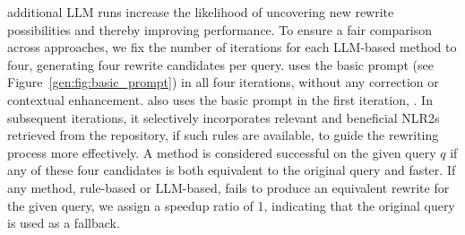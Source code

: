   additional LLM runs increase the likelihood of uncovering new rewrite possibilities and thereby improving performance.  To ensure a fair comparison across approaches, we fix the number of iterations for each LLM-based method to four, generating four rewrite candidates per query. \baseline  uses the basic prompt (see Figure~\ref{gen:fig:basic_prompt}) in all four iterations, without any correction or contextual enhancement.  \genrewrite also uses the basic prompt in the first iteration, . In subsequent iterations, it selectively incorporates relevant and beneficial NLR2s retrieved from the repository, if such rules are available, to guide the rewriting process more effectively.  A method is considered successful on the given query $q$ if any of these four candidates is both equivalent to the original query and faster. If any method, rule-based or LLM-based, fails to produce an equivalent rewrite for the given query, we assign a speedup ratio of 1, indicating that the original query is used as a fallback.





